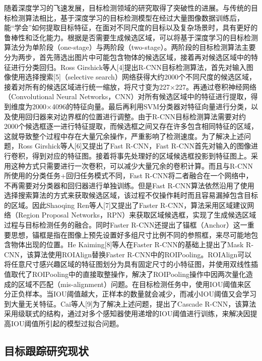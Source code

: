 随着深度学习的飞速发展，目标检测领域的研究取得了突破性的进展。与传统的目标检测算法相比，基于深度学习的目标检测模型在经过大量图像数据训练后，能“学会”如何提取目标特征，在面对不同尺度的目标以及复杂场景时，具有更好的鲁棒性和泛化能力。根据是否需要生成候选区域，可以将基于深度学习的目标检测算法分为单阶段（one-stage）与两阶段（two-stage）。两阶段的目标检测算法主要分为两步，首先筛选出图片中可能包含物体的候选区域，接着再对候选区域中的特征进行分类回归。Ross Girshick等人[4]提出R-CNN目标检测算法，首先对输入图像使用选择搜索[5]（selective search）网络获得大约2000个不同尺度的候选区域，接着对所有的候选区域进行统一缩放，将尺寸变为227×227。再通过卷积神经网络（Convolutional Neural Networks，CNN）对所有候选区域中的特征进行提取，得到维度为2000×4096的特征向量。最后再利用SVM分类器对特征向量进行分类，以及使用回归器来对边界框的位置进行调整。由于R-CNN目标检测算法需要对约2000个候选框逐一进行特征提取，而候选框之间又存在许多包含相同特征的区域，这就导致整个过程中存在大量冗余操作，严重影响了检测速度。为了解决上述问题，Ross Girshick等人[6]又提出了Fast R-CNN，Fast R-CNN首先对输入的图像进行卷积，得到对应的特征图。接着将事先处理好的区域候选框投影到特征图上。采用这种方式只需要进行一次卷积，可以减少大量冗余的卷积计算。而且与R-CNN所使用的分类任务+回归任务模式不同，Fast R-CNN将二者融合在一个网络中，不再需要对分类器和回归器进行单独训练。但是Fast R-CNN算法依然沿用了使用选择搜索算法的方式来获取候选区域，该过程不仅操作耗时而且容易漏掉包含目标的区域。因此Shaoqing Ren等人[7]又提出了Faster R-CNN，算法采用区域建议网络（Region Proposal Networks，RPN）来获取区域候选框，实现了生成候选区域过程与目标检测任务的融合。同时Faster R-CNN还提出了锚框（Anchor）这一重要思想，锚框是指在图像上预先设置好多组尺寸比例不同的参照框，来尽可能地包含物体出现的位置。He Kaiming[8]等人在Faster R-CNN的基础上提出了Mask R-CNN，该算法使用ROIAlign替换Faster R-CNN中的ROIPooling。ROIAlign可以将任意尺寸感兴趣区域的特征图划分为具有固定尺寸的小特征图，并使用双线性插值取代了ROIPooling中的直接取整操作，解决了ROIPooling操作中因两次量化造成的区域不匹配（mis-alignment）问题。在目标检测任务中，使用IOU阈值来区分正负样本。当IOU阈值越大，正样本的数量就会减少，而减小IOU阈值又会学习到大量无关特征。Cai等人[9]为了解决上述问题，提出了Cascade R-CNN，该算法采用级联式的结构，通过对多个感知器使用递增的IOU阈值进行训练，来解决因提高IOU阈值所引起的模型过拟合问题。

\subsection{目标跟踪研究现状}

